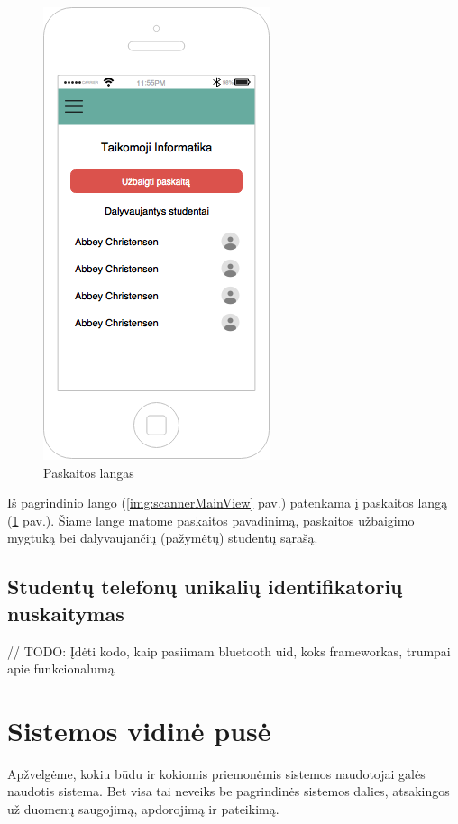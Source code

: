 \documentclass{VUMIFPSkursinis}
\begin{document}
\begin{figure}[H]
	\centering
	\includegraphics[scale=0.5]{img/kursinio_app_dest_lecture}
	\caption{Paskaitos langas}
	\label{img:scannerLectureView}
\end{figure}

Iš pagrindinio lango (\ref{img:scannerMainView} pav.) patenkama į paskaitos langą (\ref{img:scannerLectureView} pav.). Šiame lange matome paskaitos pavadinimą, paskaitos užbaigimo mygtuką bei dalyvaujančių (pažymėtų) studentų sąrašą.

\subsection{Studentų telefonų unikalių identifikatorių nuskaitymas}

// TODO: Įdėti kodo, kaip pasiimam bluetooth uid, koks frameworkas, trumpai apie funkcionalumą

\section{Sistemos vidinė pusė}

Apžvelgėme, kokiu būdu ir kokiomis priemonėmis sistemos naudotojai galės naudotis sistema. Bet visa tai neveiks be pagrindinės sistemos dalies, atsakingos už duomenų saugojimą, apdorojimą ir pateikimą.
\end{document}
